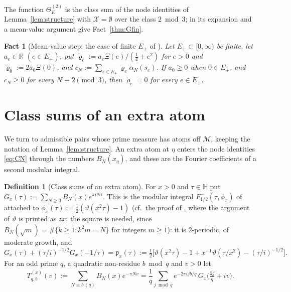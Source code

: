 \documentclass[11pt]{amsart}
\newcommand{\RR}{\mathbb R}
\newcommand{\BRS}{\mathcal M}
\newtheorem{fact}[theorem]{Fact}
\theoremstyle{definition}
\newtheorem{definition}[theorem]{Definition}
\theoremstyle{remark}
\numberwithin{equation}{section}
\begin{document}
The function $\Theta_E^{(2)}$ is the class sum of the node identities of Lemma~\ref{lem:structure} with $\mathcal X=\emptyset$ over the class
$2\bmod3$; in \cite{PaperI} its expansion and a mean-value argument give Fact~\ref{thm:Gfin}.

\begin{fact}[Mean-value step; the case of finite $E_+$ of {\cite[Lemma~B.4]{PaperI}}]\label{lem:class2-landau}
Let $E_+\subset[0,\infty)$ be finite, let $a_e\in\RR$ $(e\in E_+)$, put $\tilde\varrho_e:=a_e\Xi(e)/(\frac14+e^2)$ for $e>0$ and
$\tilde\varrho_0:=2a_0\Xi(0)$, and $c_N:=\sum_{e\in E_+}\tilde\varrho_e\alpha_N(s_e)$. If $a_0\ge0$ when $0\in E_+$, and $c_N\ge0$ for every
$N\equiv2\pmod 3$, then $\tilde\varrho_e=0$ for every $e\in E_+$.
\end{fact}

\section{Class sums of an extra atom}\label{sec:classsums}\label{ssec:extraprimes}

We turn to admissible pairs whose prime measure has atoms off $\BRS$, keeping the notation of Lemma~\ref{lem:structure}. An
extra atom at $\eta$ enters the node identities \eqref{eq:CN} through the numbers $B_N(x_\eta)$, and these are the Fourier
coefficients of a second modular integral.

\begin{definition}[Class sums of an extra atom]\label{def:classsum}
For $x>0$ and $\tau\in\mathbb H$ put $G_x(\tau):=\sum_{N\ge0}B_N(x)e^{\pi iN\tau}$. This is the modular integral
$F^-_{1/2}(\tau,\phi_x)$ of \cite[Theorem~3.1]{BRS} attached to $\phi_x(\tau):=\frac12(\vartheta(x^2\tau)-1)$ (cf.\ the proof of
\cite[Theorem~1.1]{BRS}, where the argument of $\vartheta$ is printed as $zx$; the square is needed, since
$B_N(\sqrt m)=\#\{k\ge1:k^2m=N\}$ for integers $m\ge1$): it is $2$-periodic, of moderate growth, and
\begin{equation}\label{eq:Gx-FE}
G_x(\tau)+(\tau/i)^{-1/2}G_x(-1/\tau)=\mathfrak p_x(\tau):=\tfrac12\Big[\vartheta(x^2\tau)-1+x^{-1}\vartheta(\tau/x^2)-(\tau/i)^{-1/2}\Big].
\end{equation}
For an odd prime $q$, a quadratic non-residue $b\bmod q$ and $v>0$ let
\[
T^{(x)}_{q,b}(v):=\sum_{N\equiv b\,(q)}B_N(x)e^{-\pi Nv}=\frac1q\sum_{j\bmod q}e^{-2\pi ijb/q}\,G_x\big(\tfrac{2j}q+iv\big).
\]
\end{definition}
\end{document}
